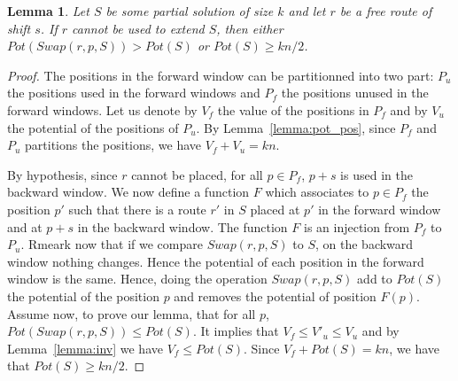 \documentclass[10pt, conference, letterpaper]{IEEEtran}
\newtheorem{lemma}[theorem]{Lemma}
\begin{document}
\begin{lemma}
Let $S$ be some partial solution of size $k$ and let $r$ be a free route of shift $s$. 
If $r$ cannot be used to extend $S$, then either $Pot(Swap(r,p,S)) > Pot(S)$ or 
$Pot(S) \geq kn/2$.
\end{lemma}

\begin{proof}\label{swap}
The positions in the forward window can be partitionned into two part: $P_{u}$ the positions used in the forward windows and $P_{f}$ the positions unused in the forward windows.
Let us denote by $V_f$ the value of the positions in $P_f$ and by $V_u$ the potential of the positions of $P_u$. By Lemma~\ref{lemma:pot_pos}, since $P_f$ and $P_u$ partitions the positions, we have $V_f + V_u = kn$.

By hypothesis, since $r$ cannot be placed, for all $p \in P_{f}$, $p+s$ is used in the backward window. We now define a function $F$ which associates to $p \in P_{f}$ the position $p'$ such that there is a route $r'$ in $S$ placed at $p'$ in the forward window and at $p+s$ in the backward window. The function $F$ is an injection from $P_{f}$ to $P_u$. Rmeark now that if we compare $Swap(r,p,S)$ to $S$, on the backward window nothing changes. 
Hence the potential of each position in the forward window is the same. Hence, doing the operation $Swap(r,p,S)$ add to $Pot(S)$ the potential of the position $p$ and removes the potential of position $F(p)$. 
Assume now, to prove our lemma, that for all $p$, $Pot(Swap(r,p,S)) \leq Pot(S)$. It implies that 
$V_f \leq V'_u \leq V_u$ and by Lemma~\ref{lemma:inv} we have $V_f \leq Pot(S)$.
Since $V_f + Pot(S) = kn$, we have that $Pot(S) \geq kn/2$.
\end{proof}
\end{document}
